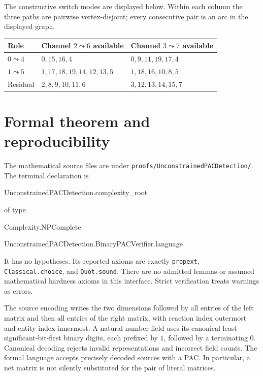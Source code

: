 \documentclass[11pt,a4paper]{article}
\begin{document}
The constructive switch modes are displayed below. Within each column the
three paths are pairwise vertex-disjoint; every consecutive pair is an
arc in the displayed graph.
\begin{center}
\small
\begin{tabular}{@{}lll@{}}
\toprule
Role & Channel $2\leadsto6$ available & Channel $3\leadsto7$ available\\
\midrule
$0\leadsto4$ & $0,15,16,4$ & $0,9,11,19,17,4$\\
$1\leadsto5$ & $1,17,18,19,14,12,13,5$ & $1,18,16,10,8,5$\\
Residual & $2,8,9,10,11,6$ & $3,12,13,14,15,7$\\
\bottomrule
\end{tabular}
\end{center}

\section{Formal theorem and reproducibility}\label{sec:formal}
The mathematical source files are under
\texttt{proofs/UnconstrainedPACDetection/}. The terminal declaration is
\begin{center}
\small\ttfamily
UnconstrainedPACDetection.complexity\_root\par
\normalfont of type\par
\ttfamily Complexity.NPComplete\par
UnconstrainedPACDetection.BinaryPACVerifier.language
\end{center}
It has no hypotheses. Its reported axioms are exactly
\texttt{propext}, \texttt{Classical.choice}, and \texttt{Quot.sound}.
There are no admitted lemmas or assumed mathematical hardness axioms in
this interface. Strict verification treats warnings as errors.

The source encoding writes the two dimensions followed by all entries of
the left matrix and then all entries of the right matrix, with reaction
index outermost and entity index innermost. A natural-number field uses
its canonical least-significant-bit-first binary digits, each prefixed
by $1$, followed by a terminating $0$. Canonical decoding rejects invalid
representations and incorrect field counts. The formal language accepts
precisely decoded sources with a PAC. In particular, a net matrix is not
silently substituted for the pair of literal matrices.
\end{document}
